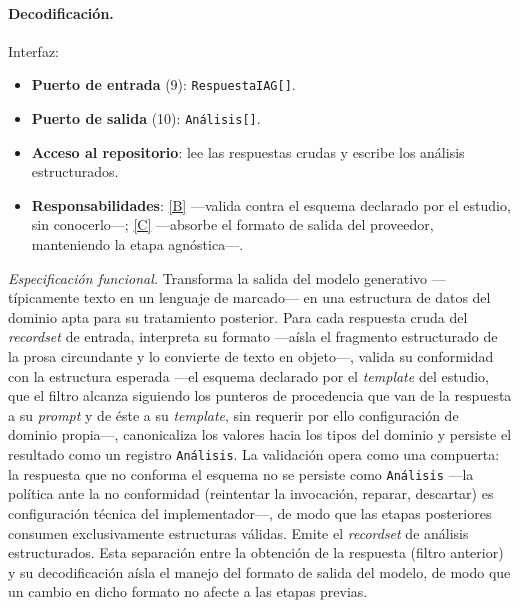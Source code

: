 \documentclass[12pt]{report}
\DeclareRobustCommand{\resp}[1]{\hyperref[tab:registro-responsabilidades]{\textcolor{respcolor}{[#1]}}}
\begin{document}
\paragraph{Decodificación.} Interfaz:
\begin{itemize}
  \item \textbf{Puerto de entrada} (9): \texttt{RespuestaIAG[]}.
  \item \textbf{Puerto de salida} (10): \texttt{Análisis[]}.
  \item \textbf{Acceso al repositorio}: lee las respuestas crudas y escribe los análisis estructurados.
  \item \textbf{Responsabilidades}: \resp{B} ---valida contra el esquema declarado por el estudio, sin conocerlo---; \resp{C} ---absorbe el formato de salida del proveedor, manteniendo la etapa agnóstica---.
\end{itemize}
\textit{Especificación funcional.} Transforma la salida del modelo generativo ---típicamente texto en un lenguaje de marcado--- en una estructura de datos del dominio apta para su tratamiento posterior. Para cada respuesta cruda del \textit{recordset} de entrada, interpreta su formato ---aísla el fragmento estructurado de la prosa circundante y lo convierte de texto en objeto---, valida su conformidad con la estructura esperada ---el esquema declarado por el \textit{template} del estudio, que el filtro alcanza siguiendo los punteros de procedencia que van de la respuesta a su \textit{prompt} y de éste a su \textit{template}, sin requerir por ello configuración de dominio propia---, canonicaliza los valores hacia los tipos del dominio y persiste el resultado como un registro \texttt{Análisis}. La validación opera como una compuerta: la respuesta que no conforma el esquema no se persiste como \texttt{Análisis} ---la política ante la no conformidad (reintentar la invocación, reparar, descartar) es configuración técnica del implementador---, de modo que las etapas posteriores consumen exclusivamente estructuras válidas. Emite el \textit{recordset} de análisis estructurados. Esta separación entre la obtención de la respuesta (filtro anterior) y su decodificación aísla el manejo del formato de salida del modelo, de modo que un cambio en dicho formato no afecte a las etapas previas.
\end{document}
